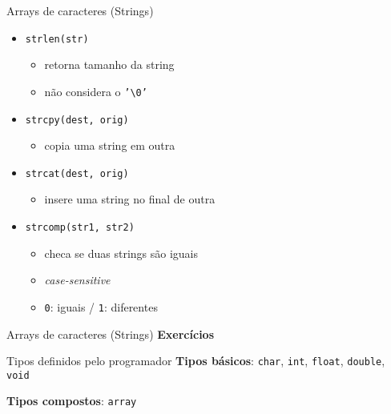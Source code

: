 \documentclass[10pt]{beamer}
\begin{document}
\begin{frame}[fragile]{Arrays de caracteres (Strings)}
    \Large
    \begin{itemize}
        \item \texttt{strlen(str)}

        \begin{itemize}
            \large
            \item retorna tamanho da string
            \item não considera o \texttt{'\textbackslash 0'}
        \end{itemize}

        \item \texttt{strcpy(dest, orig)}

        \begin{itemize}
            \large
            \item copia uma string em outra \faExclamationTriangle
        \end{itemize}

        \item \texttt{strcat(dest, orig)}

        \begin{itemize}
            \large
            \item insere uma string no final de outra \faExclamationTriangle
        \end{itemize}

        \item \texttt{strcomp(str1, str2)}

        \begin{itemize}
            \large
            \item checa se duas strings são iguais
            \item \textit{case-sensitive}
            \item \texttt{0}: iguais / \texttt{1}: diferentes
        \end{itemize}
    \end{itemize}
\end{frame}

\begin{frame}{Arrays de caracteres (Strings)}
    \huge \textbf{Exercícios}
\end{frame}

\begin{frame}{Tipos definidos pelo programador}
    \huge
    \textbf{Tipos básicos}: \texttt{char}, \texttt{int}, \texttt{float}, \texttt{double}, \texttt{void}

    \bigskip

    \textbf{Tipos compostos}: \texttt{array}
\end{frame}
\end{document}
